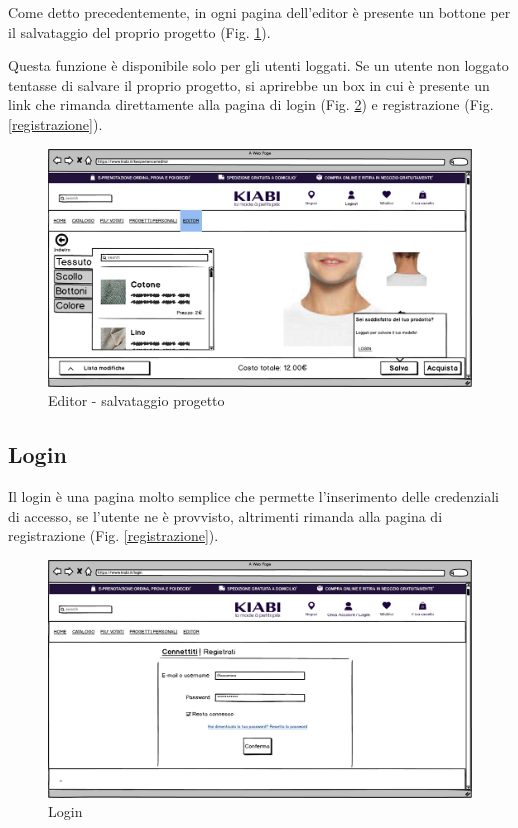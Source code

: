 \documentclass[12pt,italian,]{report}
\begin{document}
Come detto precedentemente, in ogni pagina dell'editor è presente un bottone per il salvataggio del proprio progetto (Fig. \ref{editor_salva}). 

Questa funzione è disponibile solo per gli utenti loggati. Se un utente non loggato tentasse di salvare il proprio progetto, si aprirebbe un box in cui è presente un link che rimanda direttamente alla pagina di login (Fig. \ref{login}) e registrazione (Fig. \ref{registrazione}).

\begin{figure}[h]
\centering
\includegraphics{../../balsamiq/balsamiq_finale/Editor-caratteristicacollotessutononloggato.png}
\caption{Editor - salvataggio progetto}
\label{editor_salva}
\end{figure}


\subsection{Login} 

Il login è una pagina molto semplice che permette l'inserimento delle credenziali di accesso, se l'utente ne è provvisto, altrimenti rimanda alla pagina di registrazione (Fig. \ref{registrazione}).

\begin{figure}[h]
\centering
\includegraphics{../../balsamiq/balsamiq_finale/Login.png}
\caption{Login}
\label{login}
\end{figure}
\end{document}
